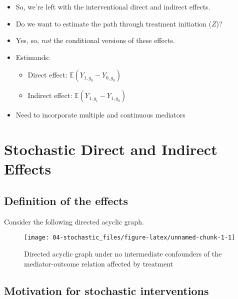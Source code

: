 \documentclass[
  12pt,
]{book}
\providecommand{\tightlist}{%
  \setlength{\itemsep}{0pt}\setlength{\parskip}{0pt}}
\theoremstyle{definition}
\theoremstyle{definition}
\theoremstyle{definition}
\newcommand{\E}{\mathbb{E}}
\newcommand{\1}{\mathbbm{1}}
\begin{document}
\begin{itemize}
\tightlist
\item
  So, we're left with the interventional direct and indirect effects.
\item
  Do we want to estimate the path through treatment initiation (\(Z\))?
\item
  Yes, so, \emph{not} the conditional versions of these effects.
\item
  Estimands:

  \begin{itemize}
  \tightlist
  \item
    Direct effect: \(\E(Y_{1,g_0} - Y_{0,g_0})\)
  \item
    Indirect effect: \(\E(Y_{1,g_1} - Y_{1,g_0})\)
  \end{itemize}
\item
  Need to incorporate multiple and continuous mediators
\end{itemize}

\hypertarget{stochastic}{%
\chapter{Stochastic Direct and Indirect Effects}\label{stochastic}}

\hypertarget{definition-of-the-effects}{%
\section{Definition of the effects}\label{definition-of-the-effects}}

Consider the following directed acyclic graph.

\begin{figure}

{\centering \texttt{[image: 04-stochastic\_files/figure-latex/unnamed-chunk-1-1]} 

}

\caption{Directed acyclic graph under no intermediate confounders of the mediator-outcome relation affected by treatment}\label{fig:unnamed-chunk-1}
\end{figure}

\hypertarget{motivation-for-stochastic-interventions}{%
\section{Motivation for stochastic interventions}\label{motivation-for-stochastic-interventions}}
\end{document}
